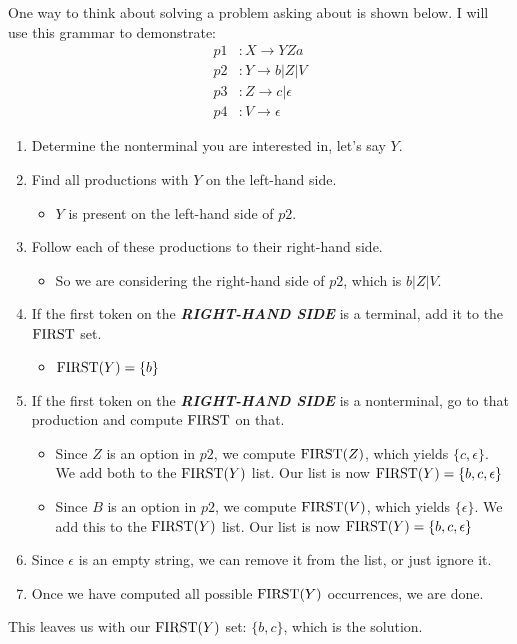 \begin{blackbox}
  One way to think about solving a problem asking about  is shown below. I will use this grammar to demonstrate:
  \begin{align*}
    p1&: X \rightarrow YZa \\
    p2&: Y \rightarrow b \vert Z \vert V \\
    p3&: Z \rightarrow c \vert \epsilon \\
    p4&: V \rightarrow \epsilon
  \end{align*}

  \begin{enumerate}[noitemsep]
  \item Determine the nonterminal you are interested in, let's say $Y$.
  \item Find all productions with $Y$ on the left-hand side.
    \begin{itemize}[noitemsep]
    \item $Y$ is present on the left-hand side of $p2$.
    \end{itemize}
  \item Follow each of these productions to their right-hand side.
    \begin{itemize}[noitemsep]
    \item So we are considering the right-hand side of $p2$, which is $b \vert Z \vert V$.
    \end{itemize}
  \item If the first token on the \textbf{\emph{RIGHT-HAND SIDE}} is a terminal, add it to the $\operatorname{\text{FIRST}}$ set.
    \begin{itemize}[noitemsep]
    \item $\operatorname{\text{FIRST}}(Y) = \lbrace b \rbrace$
    \end{itemize}
  \item If the first token on the  \textbf{\emph{RIGHT-HAND SIDE}} is a nonterminal, go to that production and compute $\operatorname{\text{FIRST}}$ on that.
    \begin{itemize}[noitemsep]
    \item Since $Z$ is an option in $p2$, we compute $\operatorname{\text{FIRST}}(Z)$, which yields $\lbrace c, \epsilon \rbrace$.
      We add both to the $\operatorname{\text{FIRST}}(Y)$ list.
      Our list is now $\operatorname{\text{FIRST}}(Y) = \lbrace b, c, \epsilon \rbrace$
    \item Since $B$ is an option in $p2$, we compute $\operatorname{\text{FIRST}}(V)$, which yields $\lbrace \epsilon \rbrace$.
      We add this to the $\operatorname{\text{FIRST}}(Y)$ list.
      Our list is now $\operatorname{\text{FIRST}}(Y) = \lbrace b, c, \epsilon \rbrace$
    \end{itemize}
  \item Since $\epsilon$ is an empty string, we can remove it from the list, or just ignore it.
  \item Once we have computed all possible $\operatorname{\text{FIRST}}(Y)$ occurrences, we are done.
  \end{enumerate}

  This leaves us with our $\operatorname{\text{FIRST}}(Y)$ set: $\lbrace b, c \rbrace$, which is the solution.
\end{blackbox}

